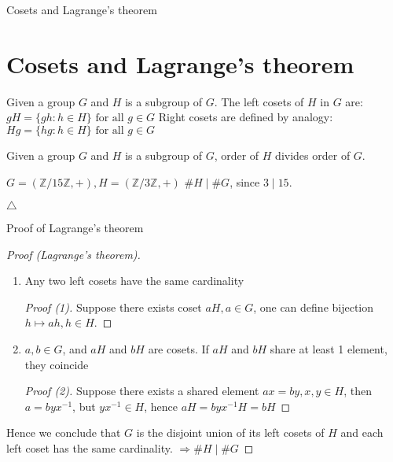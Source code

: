 \documentclass{beamer}
\begin{document}

\begin{frame}{Cosets and Lagrange's theorem}
	\section{Cosets and Lagrange's theorem}

	\begin{definition}[Coset]
		Given a group $G$ and $H$ is a subgroup of $G$. The left cosets of $H$ in $G$ are: \newline
		$gH = \{gh : h \in H\} \text{ for all } g \in G$ \newline
		Right cosets are defined by analogy: \newline
		$Hg = \{hg : h \in H\} \text{ for all } g \in G$
	\end{definition}
	
	\begin{theorem}
		Given a group $G$ and $H$ is a subgroup of $G$, order of $H$ divides order of $G$.
	\end{theorem}
	\begin{example}
		$G = (\mathbb{Z} / 15\mathbb{Z}, +), H = (\mathbb{Z} / 3\mathbb{Z}, +)$ \newline
		$\# H \mid \# G$, since $3 \mid 15$. 
	\end{example}
	$\triangle$
\end{frame}

\begin{frame}{Proof of Lagrange's theorem}
	\begin{proof}[Proof (Lagrange's theorem)]
		\begin{enumerate}
			\item Any two left cosets have the same cardinality
			\begin{proof}[Proof (1)]
				Suppose there exists coset $aH, a \in G$, one can define bijection $h \mapsto ah, h \in H$.
			\end{proof}
			\item $a, b \in G$, and $aH$ and $bH$ are cosets. If $aH$ and $bH$ share at least 1 element, they coincide
			\begin{proof}[Proof (2)]
			Suppose there exists a shared element $ax = by, x,y \in H$, then $a = byx^{-1}$, but $yx^{-1} \in H$, hence
			$aH = byx^{-1}H = bH$
			\end{proof}
		\end{enumerate}
		Hence we conclude that $G$ is the disjoint union of its left cosets of $H$ and each left coset has the same 
		cardinality. \newline
		$\Rightarrow \# H \mid \# G$
	\end{proof}
\end{frame}
\end{document}
